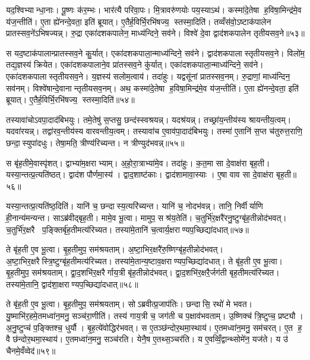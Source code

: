 यद॒श्विभ्यान्धा॒नाः। पू॒ष्णः क॑र॒म्भः। भार॑त्यै परिवा॒पः। मि॒त्रावरु॑णयोः पय॒स्याऽथ॑। कस्मा॑दे॒तेषा ह॒विषा॒मिन्द्र॑मे॒व य॑ज॒न्तीति॑। ए॒ता ह्ये॑नन्दे॒वता॒ इति॑ ब्रूयात्। ए॒तैर्\mbox{}ह॒विर्भि॒रभि॑षज्य॒ स्तस्मा॒दिति॑। तव्वँस॑वो॒ऽष्टाक॑पालेन प्रातस्सव॒ने॑ऽभिषज्यन्न्। रु॒द्रा एका॑दशकपालेन॒ माध्य॑न्दिने॒ सव॑ने। विश्वे॑ दे॒वा द्वाद॑शकपालेन तृतीयसव॒ने॥५३॥

स यद॒ष्टाक॑पालान्प्रातस्सव॒ने कु॒र्यात्। एका॑दशकपाला॒न्माध्य॑न्दिने॒ सव॑ने। द्वाद॑शकपालास्तृतीयसव॒ने। विलो॑म॒ तद्य॒ज्ञस्य॑ क्रियेत। एका॑दशकपालाने॒व प्रा॑तस्सव॒ने कु॑र्यात्। एका॑दशकपाला॒न्माध्य॑न्दिने॒ सव॑ने। एका॑दशकपालास्तृतीयसव॒ने। य॒ज्ञस्य॑ सलोम॒त्वाय॑। तदा॑हुः। यद्वसू॑नां प्रातस्सव॒नम्। रु॒द्राणां॒ माध्य॑न्दिन॒ सव॑नम्। विश्वे॑षान्दे॒वानान्तृतीयसव॒नम्। अथ॒ कस्मा॑दे॒तेषा ह॒विषा॒मिन्द्र॑मे॒व य॑ज॒न्तीति॑। ए॒ता ह्ये॑नन्दे॒वता॒ इति॑ ब्रूयात्। ए॒तैर्\mbox{}ह॒विर्भि॒रभि॑षज्य॒ स्तस्मा॒दिति॑॥५४॥\anuvakamend[ए॒क॒वि॒श आ॑हुस्तृतीयसव॒ने प्रा॑तस्सव॒नं पञ्च॑ च]

तस्यावा॑चोऽवपा॒दाद॑बिभयुः। तमे॒तेषु॑ स॒प्तसु॒ छन्द॑स्स्वश्रयन्न्। यदश्र॑यन्न्। तच्छ्रा॑य॒न्तीय॑स्य श्रायन्तीय॒त्वम्। यदवा॑रयन्न्। तद्वा॑रव॒न्तीय॑स्य वारवन्तीय॒त्वम्। तस्यावा॑च ए॒वाव॑पा॒दाद॑बिभयुः। तस्मा॑ ए॒तानि॑ स॒प्त च॑तुरुत्त॒राणि॒ छन्दा॒स्युपा॑दधुः। तेषा॒मति॒ त्रीण्य॑रिच्यन्त। न त्रीण्युद॑भवन्न्॥५५॥

स बृ॑ह॒तीमे॒वास्पृ॑शत्। द्वाभ्या॑म॒क्षराभ्याम्। अ॒हो॒रा॒त्राभ्या॑मे॒व। तदा॑हुः। क॒त॒मा सा दे॒वाक्ष॑रा बृह॒ती। यस्या॒न्तत्प्र॒त्यति॑ष्ठत्। द्वाद॑श पौर्णमा॒स्य॑। द्वाद॒शाष्ट॑काः। द्वाद॑शामावा॒स्याः। ए॒षा वाव सा दे॒वाक्ष॑रा बृह॒ती॥५६॥

यस्या॒न्तत्प्र॒त्यति॑ष्ठ॒दिति॑। यानि॑ च॒ छन्दास्य॒त्यरि॑च्यन्त। यानि॑ च॒ नोदभ॑वन्न्। तानि॒ निर्वीर्याणि ही॒नान्य॑मन्यन्त। साऽब्र॑वीद्बृह॒ती। मामे॒व भू॒त्वा। मामुप॒ सश्र॑य॒तेति॑। च॒तुर्भि॑र॒क्षरै॑रनु॒ष्टुग्बृ॑ह॒तीन्नोद॑भवत्। च॒तुर्भि॑र॒क्षरै प॒ङ्क्तिर्बृ॑ह॒तीमत्य॑रिच्यत। तस्या॑मे॒तानि॑ च॒त्वार्य॒क्षराण्यप॒च्छिद्या॑दधात्॥५७॥

ते बृ॑ह॒ती ए॒व भू॒त्वा। बृ॒ह॒तीमुप॒ सम॑श्रयताम्। अ॒ष्टा॒भिर॒क्षरै॑रु॒ष्णिग्बृ॑ह॒तीन्नोद॑भवत्। अ॒ष्टा॒भिर॒क्षरैस्त्रि॒ष्टुग्बृ॑ह॒तीमत्य॑रिच्यत। तस्या॑मे॒तान्य॒ष्टाव॒क्षराण्यप॒च्छिद्या॑दधात्। ते बृ॑ह॒ती ए॒व भू॒त्वा। बृ॒ह॒तीमुप॒ सम॑श्रयताम्। द्वा॒द॒शभि॑र॒क्षरैर्गाय॒त्री बृ॑ह॒तीन्नोद॑भवत्। द्वा॒द॒शभि॑र॒क्षरै॒र्जग॑ती बृह॒तीमत्य॑रिच्यत। तस्या॑मे॒तानि॒ द्वाद॑शा॒क्षराण्यप॒च्छिद्या॑दधात्॥५८॥

ते बृ॑ह॒ती ए॒व भू॒त्वा। बृ॒ह॒तीमुप॒ सम॑श्रयताम्। सोऽब्रवीत्प्र॒जाप॑तिः। छन्दासि॒ रथो॑ मे भवत। यु॒ष्माभि॑र॒हमे॒तमध्वा॑न॒मनु॒ सञ्च॑रा॒णीति॑। तस्य॑ गाय॒त्री च॒ जग॑ती च प॒क्षाव॑भवताम्। उ॒ष्णिक्च॑ त्रि॒ष्टुप्च॒ प्रष्ट्यौ। अ॒नु॒ष्टुप्च॑ प॒ङ्क्तिश्च॒ धुर्यौ। बृ॒ह॒त्ये॑वोद्धिर॑भवत्। स ए॒तञ्छ॑न्दोर॒थमा॒स्थाय॑। ए॒तमध्वा॑न॒मनु॒ सम॑चरत्। ए॒त ह॒ वै छ॑न्दोर॒थमा॒स्थाय॑। ए॒तमध्वा॑न॒मनु॒ सञ्च॑रति। येनै॒ष ए॒तथ्स॒ञ्चर॑ति। य ए॒वव्विँ॒द्वान्थ्सोमे॑न॒ यज॑ते। य उ॑ चैनमे॒वँव्वेद॑॥५९॥\anuvakamend[अ॒भ॒व॒न्वाव सा दे॒वाक्ष॑रा बृह॒त्य॑दधा॒द्द्वाद॑शा॒क्षराण्यप॒च्छिद्या॑दधादा॒स्थाय॒ षट्च॑]

